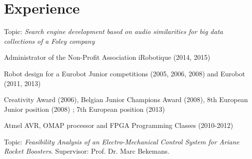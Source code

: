 \documentclass[a4paper]{deedy-resume} %
\begin{document}
\begin{minipage}[t]{0.73\textwidth} %


\section{Experience}


Topic: \textit{Search engine development based on audio similarities for big data collections of a Foley company}

\sectionspace %



\vspace{\topsep} %
\begin{tightitemize}
\item Administrator of the Non-Profit Association iRobotique (2014, 2015)
\item Robot design for a Eurobot Junior competitions (2005, 2006, 2008) and Eurobot (2011, 2013)
\item Creativity Award (2006), Belgian Junior Champions Award (2008), 8th European Junior position (2008) ; 7th European position (2013)
\item Atmel AVR, OMAP processor and FPGA Programming Classes (2010-2012)
\end{tightitemize}

\sectionspace %



Topic: \textit{Feasibility Analysis of an Electro-Mechanical Control System for Ariane Rocket Boosters}. Supervisor: Prof. Dr. Marc Bekemans.


\end{minipage}
\end{document}
